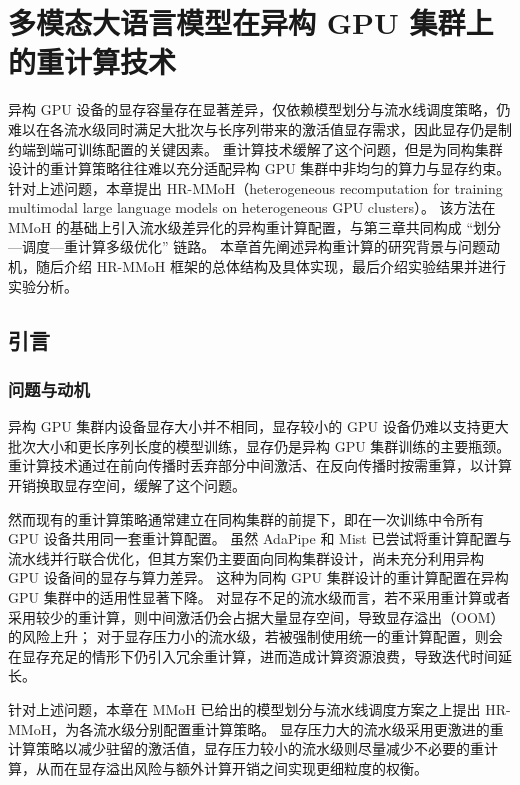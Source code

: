\chapter{多模态大语言模型在异构 GPU 集群上的重计算技术}

异构 GPU 设备的显存容量存在显著差异，仅依赖模型划分与流水线调度策略，仍难以在各流水级同时满足大批次与长序列带来的激活值显存需求，因此显存仍是制约端到端可训练配置的关键因素。
重计算技术缓解了这个问题，但是为同构集群设计的重计算策略往往难以充分适配异构 GPU 集群中非均匀的算力与显存约束。
针对上述问题，本章提出 HR-MMoH（heterogeneous recomputation for training multimodal large language models on heterogeneous GPU clusters）。
该方法在 MMoH 的基础上引入流水级差异化的异构重计算配置，与第三章共同构成 “划分—调度—重计算多级优化” 链路。
本章首先阐述异构重计算的研究背景与问题动机，随后介绍 HR-MMoH 框架的总体结构及具体实现，最后介绍实验结果并进行实验分析。

\section{引言}
\label{sec:HR-MMoH-intro}

\subsection{问题与动机}
\label{sec:chap4-motivation}

异构 GPU 集群内设备显存大小并不相同，显存较小的 GPU 设备仍难以支持更大批次大小和更长序列长度的模型训练，显存仍是异构 GPU 集群训练的主要瓶颈。
重计算技术通过在前向传播时丢弃部分中间激活、在反向传播时按需重算，以计算开销换取显存空间，缓解了这个问题。

然而现有的重计算策略通常建立在同构集群的前提下，即在一次训练中令所有 GPU 设备共用同一套重计算配置。
虽然 AdaPipe\cite{adapipe2024} 和 Mist\cite{mist2025} 已尝试将重计算配置与流水线并行联合优化，但其方案仍主要面向同构集群设计，尚未充分利用异构 GPU 设备间的显存与算力差异。
这种为同构 GPU 集群设计的重计算配置在异构 GPU 集群中的适用性显著下降。
对显存不足的流水级而言，若不采用重计算或者采用较少的重计算，则中间激活仍会占据大量显存空间，导致显存溢出（OOM）的风险上升；
对于显存压力小的流水级，若被强制使用统一的重计算配置，则会在显存充足的情形下仍引入冗余重计算，进而造成计算资源浪费，导致迭代时间延长。

针对上述问题，本章在 MMoH 已给出的模型划分与流水线调度方案之上提出 HR-MMoH，为各流水级分别配置重计算策略。
显存压力大的流水级采用更激进的重计算策略以减少驻留的激活值，显存压力较小的流水级则尽量减少不必要的重计算，从而在显存溢出风险与额外计算开销之间实现更细粒度的权衡。

